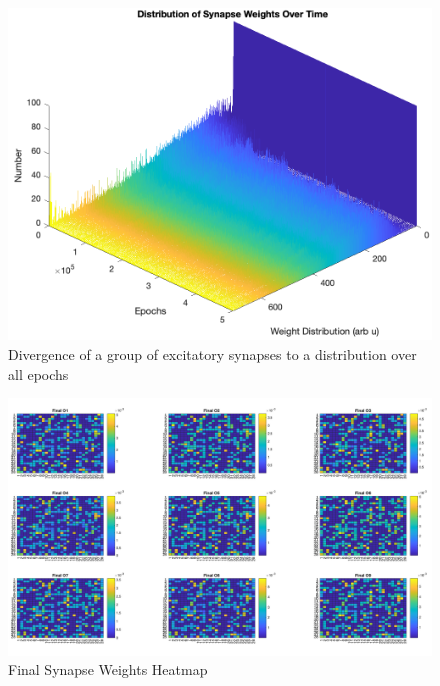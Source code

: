 \documentclass[11pt, twocolumn]{article}
\begin{document}
\begin{figure}[H]
	\centering
	\includegraphics[width=\linewidth]{weights_drift_3D}
	\caption{Divergence of a group of excitatory synapses to a distribution over all epochs}
	\label{fig:weights_drift_3D}
\end{figure}

\begin{figure}[H]
	\centering
	\includegraphics[width=\linewidth]{final_synapse_weights}
	\caption{Final Synapse Weights Heatmap}
	\label{fig:final_synapse_weights}
\end{figure}
\end{document}

